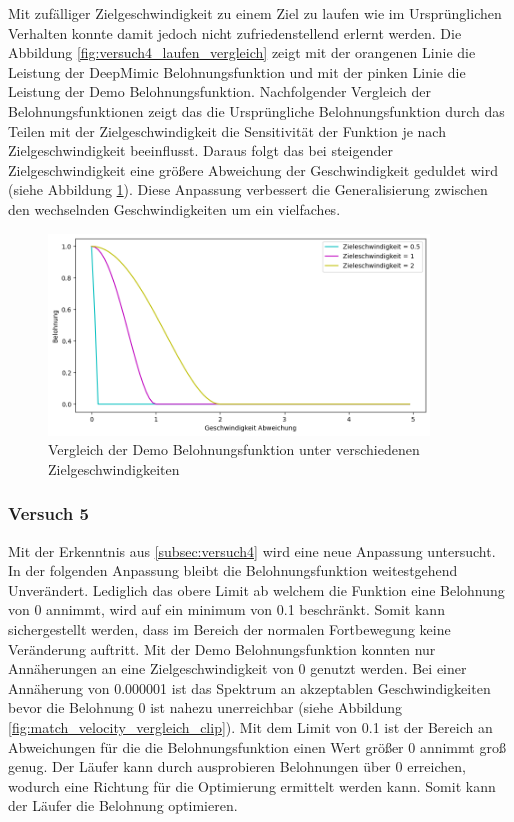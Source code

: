 Mit zufälliger Zielgeschwindigkeit zu einem Ziel zu laufen wie im Ursprünglichen Verhalten konnte damit jedoch nicht zufriedenstellend erlernt werden. Die Abbildung \ref{fig:versuch4_laufen_vergleich} zeigt mit der orangenen Linie die Leistung der DeepMimic Belohnungsfunktion und mit der pinken Linie die Leistung der Demo Belohnungsfunktion. Nachfolgender Vergleich der Belohnungsfunktionen zeigt das die Ursprüngliche Belohnungsfunktion durch das Teilen mit der Zielgeschwindigkeit die Sensitivität der Funktion je nach Zielgeschwindigkeit beeinflusst. Daraus folgt das bei steigender Zielgeschwindigkeit eine größere Abweichung der Geschwindigkeit geduldet wird (siehe Abbildung \ref{fig:match_velocity_demo_vergleich}). Diese Anpassung verbessert die Generalisierung zwischen den wechselnden Geschwindigkeiten um ein vielfaches.

\begin{figure}[H]
  \centering  
  \includegraphics[width=0.9\textwidth]{img/match_velocity_demo_vergleich}
  \caption{Vergleich der Demo Belohnungsfunktion unter verschiedenen Zielgeschwindigkeiten}
  \label{fig:match_velocity_demo_vergleich}
\end{figure}

\subsubsection{Versuch 5}
Mit der Erkenntnis aus \ref{subsec:versuch4} wird eine neue Anpassung untersucht. In der folgenden Anpassung bleibt die Belohnungsfunktion weitestgehend Unverändert. Lediglich das obere Limit ab welchem die Funktion eine Belohnung von 0 annimmt, wird auf ein minimum von 0.1 beschränkt. Somit kann sichergestellt werden, dass im Bereich der normalen Fortbewegung keine Veränderung auftritt. Mit der Demo Belohnungsfunktion konnten nur Annäherungen an eine Zielgeschwindigkeit von 0 genutzt werden. Bei einer Annäherung von 0.000001 ist das Spektrum an akzeptablen Geschwindigkeiten bevor die Belohnung 0 ist nahezu unerreichbar (siehe Abbildung \ref{fig:match_velocity_vergleich_clip}). Mit dem Limit von 0.1 ist der Bereich an Abweichungen für die die Belohnungsfunktion einen Wert größer 0 annimmt groß genug. Der Läufer kann durch ausprobieren Belohnungen über 0 erreichen, wodurch eine Richtung für die Optimierung ermittelt werden kann. Somit kann der Läufer die Belohnung optimieren.\\

